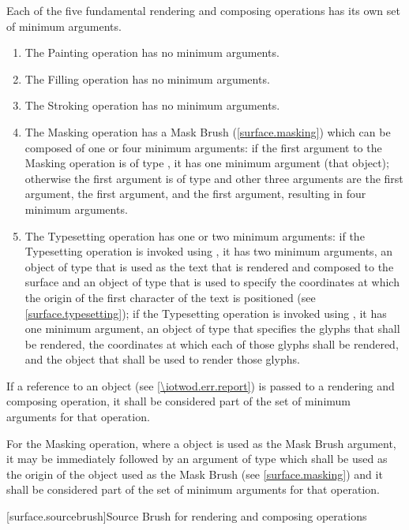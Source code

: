 \pnum
Each of the five fundamental rendering and composing operations has its own set of minimum arguments.
\begin{enumerate}
	\item The Painting operation has no minimum arguments.
	\item The Filling operation has no minimum arguments.
	\item The Stroking operation has no minimum arguments.
	\item The Masking operation has a Mask Brush (\ref{surface.masking}) which can be composed of one or four minimum arguments: if the first argument to the Masking operation is of type , it has one minimum argument (that  object); otherwise the first argument is of type  and other three arguments are the first  argument, the first  argument, and the first  argument, resulting in four minimum arguments.
	\item The Typesetting operation has one or two minimum arguments: if the Typesetting operation is invoked using , it has two minimum arguments, an object of type  that is used as the text that is rendered and composed to the surface and an object of type  that is used to specify the coordinates at which the origin of the first character of the text is positioned (see \ref{surface.typesetting}); if the Typesetting operation is invoked using , it has one minimum argument, an object of type  that specifies the glyphs that shall be rendered, the coordinates at which each of those glyphs shall be rendered, and the  object that shall be used to render those glyphs.
\end{enumerate}

\pnum
If a reference to an  object (see \ref{\iotwod.err.report}) is passed to a rendering and composing operation, it shall be considered part of the set of minimum arguments for that operation.

\pnum
For the Masking operation, where a  object is used as the Mask Brush argument, it may be immediately followed by an argument of type  which shall be used as the origin of the  object used as the Mask Brush (see \ref{surface.masking}) and it shall be considered part of the set of minimum arguments for that operation.

 [surface.sourcebrush]{Source Brush for rendering and composing operations}

